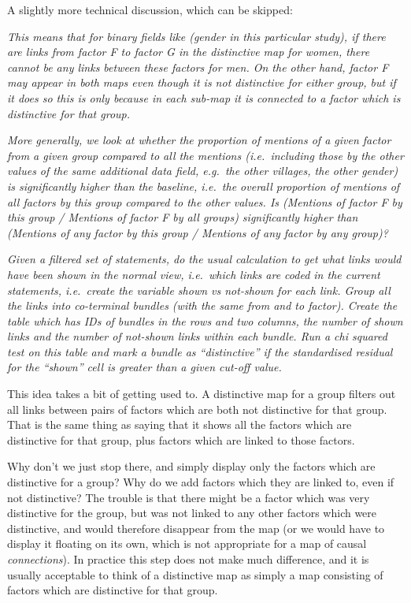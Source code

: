 \documentclass[
]{book}
\begin{document}
A slightly more technical discussion, which can be skipped:

\emph{This means that for binary fields like (gender in this particular study), if there are links from factor F to factor G in the distinctive map for women, there cannot be any links between these factors for men. On the other hand, factor F may appear in both maps even though it is not distinctive for either group, but if it does so this is only because in each sub-map it is connected to a factor which is distinctive for that group.}

\emph{More generally, we look at whether the proportion of mentions of a given factor from a given group compared to all the mentions (i.e.~including those by the other values of the same additional data field, e.g.~the other villages, the other gender) is significantly higher than the baseline, i.e.~the overall proportion of mentions of all factors by this group compared to the other values. Is (Mentions of factor F by this group / Mentions of factor F by all groups) significantly higher than (Mentions of any factor by this group / Mentions of any factor by any group)?}

\emph{Given a filtered set of statements, do the usual calculation to get what links would have been shown in the normal view, i.e.~which links are coded in the current statements, i.e.~create the variable shown vs not-shown for each link. Group all the links into co-terminal bundles (with the same from and to factor). Create the table which has IDs of bundles in the rows and two columns, the number of shown links and the number of not-shown links within each bundle. Run a chi squared test on this table and mark a bundle as ``distinctive'' if the standardised residual for the ``shown'' cell is greater than a given cut-off value.}

This idea takes a bit of getting used to. A distinctive map for a group filters out all links between pairs of factors which are both not distinctive for that group. That is the same thing as saying that it shows all the factors which are distinctive for that group, plus factors which are linked to those factors.

Why don't we just stop there, and simply display only the factors which are distinctive for a group? Why do we add factors which they are linked to, even if not distinctive? The trouble is that there might be a factor which was very distinctive for the group, but was not linked to any other factors which were distinctive, and would therefore disappear from the map (or we would have to display it floating on its own, which is not appropriate for a map of causal \emph{connections}). In practice this step does not make much difference, and it is usually acceptable to think of a distinctive map as simply a map consisting of factors which are distinctive for that group.
\end{document}
